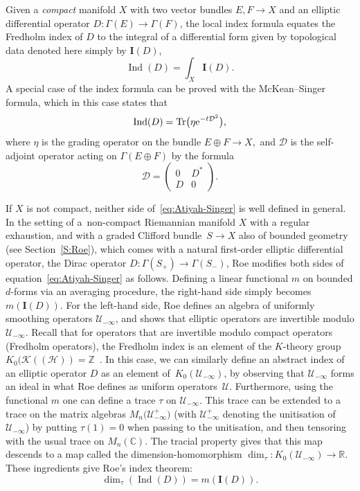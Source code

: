 \documentclass[pdftex]{sigma}
\numberwithin{equation}{section}
\begin{document}
Given a \textit{compact} manifold $X$ with two vector bundles $E,F \to X$ and an elliptic differential operator $D\colon \Gamma(E) \to \Gamma(F)$, the local index formula equates the Fredholm index of $D$ to the integral of a differential form given by topological data denoted here simply by $\mathbf{I}(D)$,
\begin{equation}\label{eq:Atiyah-Singer}
\operatorname{Ind}(D) = \int_X \mathbf{I}(D).
\end{equation}
A special case of the index formula can be proved with the McKean--Singer formula, which in this case states that
\[
 \operatorname{Ind}(D) = \mathrm{Tr}\big(\eta {\rm e}^{-t\mathcal{D}^2}\big),
\]
where $\eta$ is the grading operator on the bundle $E\oplus F\to X,$ and $\mathcal{D}$ is the self-adjoint operator acting on $\Gamma(E\oplus F)$ by the formula
\[
 \mathcal{D} = \begin{pmatrix} 0 & D^* \\ D & 0\end{pmatrix}.
\]

If $X$ is not compact, neither side of~\eqref{eq:Atiyah-Singer} is well defined in general. In the setting of a~non-compact Riemannian manifold $X$ with a regular exhaustion, and with a graded Clifford bundle~${S \to X}$ also of bounded geometry (see Section~\ref{S:Roe}), which comes with a natural first-order elliptic differential operator, the Dirac operator $D\colon \Gamma(S_+) \to \Gamma(S_-)$, Roe modifies both sides of equation~\eqref{eq:Atiyah-Singer} as follows. Defining a linear functional $m$ on bounded $d$-forms via an averaging procedure, the right-hand side simply becomes $m(\mathbf{I}(D))$. For the left-hand side, Roe defines an algebra of uniformly smoothing operators $\mathcal{U}_{-\infty}$, and shows that elliptic operators are invertible modulo $\mathcal{U}_{-\infty}$. Recall that for operators that are invertible modulo compact operators (Fredholm operators), the Fredholm index is an element of the $K$-theory group $K_0(\mathcal{K}((\mathcal{H})) = \mathbb{Z}$~\cite{Wegge-Olsen1993}. In this case, we can similarly define an abstract index of an elliptic operator $D$ as an element of~$K_0(\mathcal{U}_{-\infty})$, by observing that $\mathcal{U}_{-\infty}$ forms an ideal in what Roe defines as uniform operators~$\mathcal{U}$. Furthermore, using the functional $m$ one can define a trace $\tau$ on $\mathcal{U}_{-\infty}$. This trace can be extended to a trace on the matrix algebras $M_n\big(\mathcal{U}_{-\infty}^+\big)$ \big(with $\mathcal{U}_{-\infty}^+$ denoting the unitisation of $\mathcal{U}_{-\infty}$\big) by putting $\tau(1)=0$ when passing to the unitisation, and then tensoring with the usual trace on $M_n(\mathbb{C})$. The tracial property gives that this map descends to a map called the dimension-homomorphism $\dim_\tau\colon K_0(\mathcal{U}_{-\infty}) \to \mathbb{R}$. These ingredients give Roe's index theorem:
\begin{equation*}
\dim_\tau(\operatorname{Ind}(D)) = m(\mathbf{I}(D)).
\end{equation*}
\end{document}
